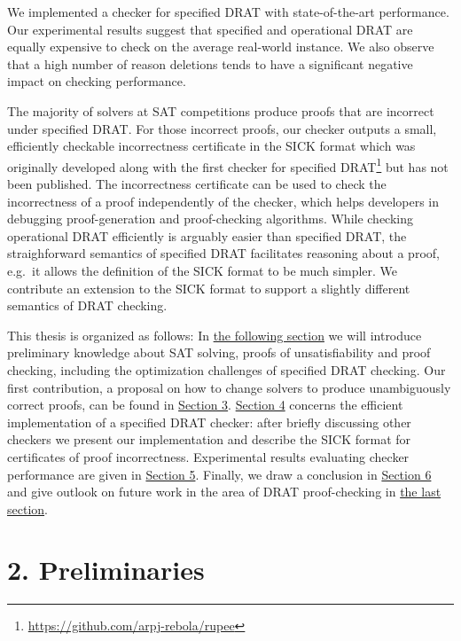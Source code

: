 \documentclass[
]{report}
\begin{document}
We implemented a checker for specified DRAT with state-of-the-art
performance. Our experimental results suggest that specified and
operational DRAT are equally expensive to check on the average
real-world instance. We also observe that a high number of reason
deletions tends to have a significant negative impact on checking
performance.

The majority of solvers at SAT competitions produce proofs that are
incorrect under specified DRAT. For those incorrect proofs, our checker
outputs a small, efficiently checkable incorrectness certificate in the
SICK format which was originally developed along with the first checker
for specified DRAT\footnote{\url{https://github.com/arpj-rebola/rupee}}
but has not been published. The incorrectness certificate can be used to
check the incorrectness of a proof independently of the checker, which
helps developers in debugging proof-generation and proof-checking
algorithms. While checking operational DRAT efficiently is arguably
easier than specified DRAT, the straighforward semantics of specified
DRAT facilitates reasoning about a proof, e.g.~it allows the definition
of the SICK format to be much simpler. We contribute an extension to the
SICK format to support a slightly different semantics of DRAT checking.

This thesis is organized as follows: In
\protect\hyperlink{preliminaries}{the following section} we will
introduce preliminary knowledge about SAT solving, proofs of
unsatisfiability and proof checking, including the optimization
challenges of specified DRAT checking. Our first contribution, a
proposal on how to change solvers to produce unambiguously correct
proofs, can be found in
\protect\hyperlink{drat-proofs-without-deletions-of-unique-reason-clauses}{Section
3}.
\protect\hyperlink{complete-and-efficient-drat-proof-checking}{Section
4} concerns the efficient implementation of a specified DRAT checker:
after briefly discussing other checkers we present our implementation
and describe the SICK format for certificates of proof incorrectness.
Experimental results evaluating checker performance are given in
\protect\hyperlink{experimental-evaluation}{Section 5}. Finally, we draw
a conclusion in \protect\hyperlink{conclusion}{Section 6} and give
outlook on future work in the area of DRAT proof-checking in
\protect\hyperlink{future-work}{the last section}.

\hypertarget{preliminaries}{%
\chapter{2. Preliminaries}\label{preliminaries}}
\end{document}
